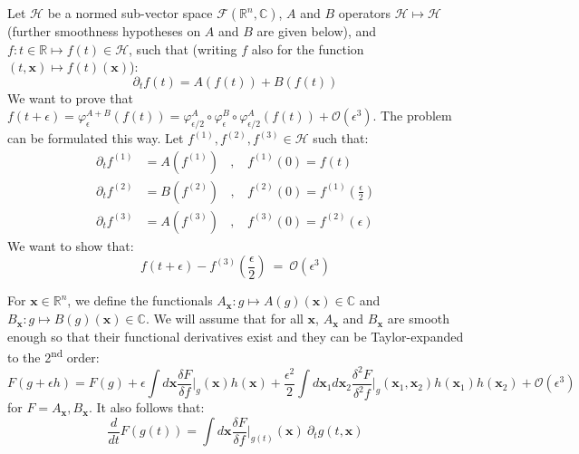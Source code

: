 \documentclass{article}
\newcommand{\fder}[2]{\frac{\delta #1}{\delta f}\Bigr|_{#2}}
\newcommand{\fdder}[2]{\frac{\delta^2 #1}{\delta^2 f}\Bigr|_{#2}}
\begin{document}
\bigskip
Let $\mathcal{H}$ be a normed sub-vector space $\mathcal{F}(\mathbb{R}^n,\mathbb{C})$, $A$ and $B$ operators $\mathcal{H} \longmapsto \mathcal{H}$ (further smoothness hypotheses on $A$ and $B$ are given below), and $f:t\in \mathbb{R} \longmapsto f(t)\in \mathcal{H}$, such that (writing $f$ also for the function $(t,\mathbf{x}) \longmapsto f(t)(\mathbf{x})$):
\begin{equation}\label{initialEq}
    \partial_t f(t) = A(f(t)) + B(f(t))
\end{equation}
We want to prove that $f(t+\epsilon)=\varphi^{A+B}_{\epsilon}(f(t))=\varphi^A_{\epsilon/2}\circ\varphi^B_{\epsilon}\circ\varphi^A_{\epsilon/2}(f(t))+\mathcal{O}(\epsilon^3)$. The problem can be formulated this way. Let $f^{(1)},f^{(2)},f^{(3)}\in \mathcal{H}$ such that:
\begin{equation}\label{TSM}
\begin{split}
    \partial_t f^{(1)} &= A(f^{(1)})~~~~,~~~~ f^{(1)}(0)=f(t)\\
    \partial_t f^{(2)} &= B(f^{(2)})~~~~,~~~~ f^{(2)}(0)=f^{(1)}(\frac{\epsilon}{2})\\
    \partial_t f^{(3)} &= A(f^{(3)})~~~~,~~~~ f^{(3)}(0)=f^{(2)}(\epsilon)
    \end{split}
\end{equation}
We want to show that:
\begin{equation}\label{Theo}
    f(t+\epsilon)-f^{(3)}(\frac{\epsilon}{2}) ~=~ \mathcal{O}(\epsilon^3)
\end{equation}

For $\mathbf{x}\in \mathbb{R}^n$, we define the functionals $A_\mathbf{x} : g \longmapsto A(g)(\mathbf{x})\in \mathbb{C}$ and $B_\mathbf{x} : g \longmapsto B(g)(\mathbf{x})\in \mathbb{C}$. We will assume that for all $\mathbf{x}$, $A_\mathbf{x}$ and $B_\mathbf{x}$ are smooth enough so that their functional derivatives exist and they can be Taylor-expanded to the 2\textsuperscript{nd} order:
\begin{equation}\label{Taylor}
    F(g+\epsilon h)=F(g)+\epsilon\int d\mathbf{x}\fder{F}{g}(\mathbf{x}) h(\mathbf{x})+\frac{\epsilon^2}{2}\int d\mathbf{x}_1d\mathbf{x}_2 \fdder{F}{g}(\mathbf{x}_1,\mathbf{x}_2)h(\mathbf{x}_1)h(\mathbf{x}_2)+\mathcal{O}(\epsilon^3)
\end{equation}
for $F=A_\mathbf{x},B_\mathbf{x}$. It also follows that:
\begin{equation}\label{totalder}
    \frac{d}{dt}F(g(t))=\int d\mathbf{x}\fder{F}{g(t)}(\mathbf{x})~\partial_t g(t,\mathbf{x})
\end{equation}
\end{document}

